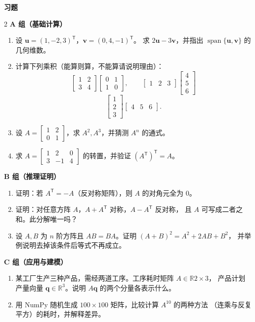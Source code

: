 \documentclass[11pt,a4paper,openany]{ctexbook}
\DeclareMathOperator{\Span}{span}
\newcommand{\R}{\mathbb{R}}
\newcommand{\Rnum}[1]{\mathbb{R}^{#1}}
\newcommand{\exhead}{%
  \par\addvspace{12pt}%
  {\noindent\sffamily\bfseries\Large\color{qing} 习题\par}%
  \vspace{-4pt}\noindent{\color{qing!32}\rule{\linewidth}{0.7pt}}\par\vspace{6pt}}
\begin{document}
\exhead
\begin{multicols}{2}
\small
\textbf{A 组（基础计算）}
\begin{enumerate}[leftmargin=1.6em, itemsep=3pt]
\item 设 $\boldsymbol{u}=(1,-2,3)^{\mathsf T}$，$\boldsymbol{v}=(0,4,-1)^{\mathsf T}$。
      求 $2\boldsymbol{u}-3\boldsymbol{v}$，并指出 $\Span\{\boldsymbol{u},\boldsymbol{v}\}$ 的几何维数。
\item 计算下列乘积（能算则算，不能算请说明理由）：
      \[ \begin{bmatrix}1&2\\3&4\end{bmatrix}
         \begin{bmatrix}0&1\\1&0\end{bmatrix},\qquad
         \begin{bmatrix}1&2&3\end{bmatrix}
         \begin{bmatrix}4\\5\\6\end{bmatrix} \]
      \[ \begin{bmatrix}1\\2\\3\end{bmatrix}
         \begin{bmatrix}4&5&6\end{bmatrix}. \]
\item 设 $A=\begin{bmatrix}1&2\\0&1\end{bmatrix}$，求 $A^2,A^3$，并猜测 $A^n$ 的通式。
\item 求 $A=\begin{bmatrix}1&2&0\\3&-1&4\end{bmatrix}$ 的转置，并验证 $(A^{\mathsf T})^{\mathsf T}=A$。
\end{enumerate}
\textbf{B 组（推理证明）}
\begin{enumerate}[leftmargin=1.6em, itemsep=3pt, start=5]
\item 证明：若 $A^{\mathsf T}=-A$（反对称矩阵），则 $A$ 的对角元全为 $0$。
\item 证明：对任意方阵 $A$，$A+A^{\mathsf T}$ 对称，$A-A^{\mathsf T}$ 反对称，
      且 $A$ 可写成二者之和。此分解唯一吗？
\item 设 $A,B$ 为 $n$ 阶方阵且 $AB=BA$。证明 $(A+B)^2=A^2+2AB+B^2$，
      并举例说明去掉该条件后等式不再成立。
\end{enumerate}
\textbf{C 组（应用与建模）}
\begin{enumerate}[leftmargin=1.6em, itemsep=3pt, start=8]
\item 某工厂生产三种产品，需经两道工序。工序耗时矩阵 $A\in\R{2\times 3}$，
      产品计划产量向量 $\boldsymbol{q}\in\Rnum{3}$。说明 $A\boldsymbol{q}$ 的两个分量各表示什么。
\item 用 NumPy 随机生成 $100\times 100$ 矩阵，比较计算 $A^{10}$ 的两种方法
      （连乘与反复平方）的耗时，并解释差异。
\end{enumerate}
\end{multicols}
\end{document}
